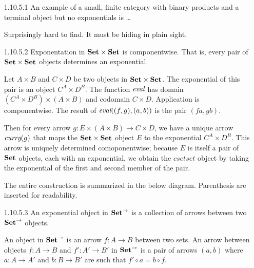 \documentclass{article}
\begin{document}
\begin{enumerate}
\item [1.10.5.1]
  An example of a small, finite category with binary products and a terminal object but no exponentials is \ldots

  Surprisingly hard to find.
  It must be hiding in plain sight.

\item [1.10.5.2]
  Exponentation in $\mathbf{Set} \times \mathbf{Set}$ is componentwise.
  That is, every pair of $\mathbf{Set} \times \mathbf{Set}$ objects determines an exponential.
  
  Let $A \times B$ and $C \times D$ be two objects in $\mathbf{Set} \times \mathbf{Set}$.
  The exponential of this pair is an object $C^A \times D^B$.
  The function $\emph{eval}$  has domain $(C^A \times D^B) \times (A \times B)$ and codomain $C \times D$.
  Application is componentwise.
  The result of $\emph{eval}((f, g), (a,b))$ is the pair $(f a, g b)$.

  Then for every arrow $g : E \times (A \times B) \rightarrow C \times D$, we have a unique arrow $\emph{curry}(g)$ that maps the $\mathbf{Set} \times \mathbf{Set}$ object $E$ to the exponential $C^A \times D^B$.
  This arrow is uniquely determined comoponentwise; because $E$ is itself a pair of $\mathbf{Set}$ objects, each with an exponential, we obtain the $csetset$ object by taking the exponential of the first and second member of the pair.
  
  The entire construction is summarized in the below diagram.
  Parenthesis are inserted for readability.
  \begin{center}
  \end{center}

\newpage
\item [1.10.5.3]
  An exponential object in $\mathbf{Set}^{\rightarrow}$ is a collection of arrows between two $\mathbf{Set}^{\rightarrow}$ objects.

  An object in $\mathbf{Set}^{\rightarrow}$ is an arrow $f: A \rightarrow B$ between two sets.
  An arrow between objects $f : A \rightarrow B$ and $f' : A' \rightarrow B'$ in $\mathbf{Set}^{\rightarrow}$ is a pair of arrows $(a,b)$ where $a : A \rightarrow A'$ and $b: B \rightarrow B'$ are such that $f' \circ a = b \circ f$.
  \begin{center}
\end{center}
\end{enumerate}
\end{document}
